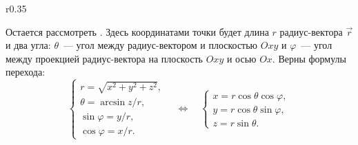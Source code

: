 \begin{wrapfigure}{r}{0.35\tw}
	\caption{}
	\label{pic:math-coord-sys-sphere}
	\vspace{-1.5pc}
\end{wrapfigure}
Остается рассмотреть . Здесь координатами точки будет длина $r$ радиус-вектора $\vec{r}$ и два угла: $\theta$~--- угол между радиус-вектором и плоскостью $Oxy$ и $\varphi$~--- угол между проекцией радиус-вектора на плоскость $Oxy$ и осью $Ox$. Верны формулы перехода:
\begin{equation}
	\begin{cases}
		r = \sqrt{x^2 + y^2 + z^2},\\
		\theta = \arcsin{z/r},\\
		\sin \varphi = y/r,\\
		\cos \varphi = x/r.
	\end{cases}
	\quad \Leftrightarrow \quad
	\begin{cases}
		x = r \cos \theta \cos \varphi	,\\
		y = r \cos \theta \sin \varphi,\\
		z = r \sin \theta.
	\end{cases}
\end{equation}
